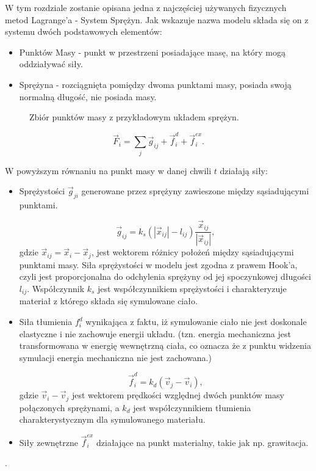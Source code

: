 W tym rozdziale zostanie opisana jedna z najczęściej używanych
fizycznych metod Lagrange'a - System Sprężyn. Jak wskazuje nazwa modelu składa
się on z systemu dwóch podstawowych elementów:
\begin{itemize}
\item Punktów Masy - punkt w przestrzeni posiadające masę, na który mogą oddziaływać siły.
\item Sprężyna - rozciągnięta pomiędzy dwoma punktami masy, posiada swoją normalną długość, nie posiada masy.

\end{itemize} 

\begin{figure}[ht]
\centering

\caption{Zbiór punktów masy z przykładowym układem sprężyn.}
\end{figure}

%
%
\begin{equation}
\vec{F}_{i} = \sum_{j} \vec{g}_{ij} + \vec{f}^{d}_i + \vec{f}^{ex}_{i}.
\end{equation}

W powyższym równaniu na punkt masy w danej chwili $t$ działają siły:
\begin{itemize}
\item  Sprężystości $\vec{g}_{ji}$ generowane przez sprężyny zawieszone między sąsiadującymi punktami.

\begin{equation}
\vec{g}_{ij} = k_s (|\vec{x}_{ij}| - l_{ij})\frac{\vec{x}_{ij}}{|\vec{x}_{ij}|},
\end{equation}
gdzie $\vec{x}_{ij} = \vec{x}_i - \vec{x}_j$, jest wektorem różnicy położeń
między sąsiadującymi punktami masy. Siła sprężystości w modelu jest zgodna z
prawem Hook'a, czyli jest proporcjonalna do odchylenia sprężyny od jej
spoczynkowej długości $l_{ij}$. Współczynnik $k_s$ jest współczynnikiem
sprężystości i charakteryzuje materiał z którego składa się symulowane ciało.

\item Siła tłumienia $f^{d}_i$ wynikająca z faktu, iż symulowanie ciało nie jest
doskonale elastyczne i nie zachowuje energii układu. (tzn. energia mechaniczna
		jest transformowana w energię wewnętrzną ciała, co oznacza że z punktu
		widzenia symulacji energia mechaniczna nie jest zachowana.)

\begin{equation}
\vec{f}^{d}_i = k_d(\vec{v}_j - \vec{v}_i),
\end{equation}
gdzie $\vec{v}_i - \vec{v}_j$ jest wektorem prędkości względnej dwóch punktów
masy połączonych sprężynami, a $k_d$ jest współczynnikiem tłumienia charakterystycznym dla symulowanego materiału.

\item Siły zewnętrzne $\vec{f}^{ex}_{i}$ działające na punkt materialny, takie jak np. grawitacja.
\end{itemize}. 


